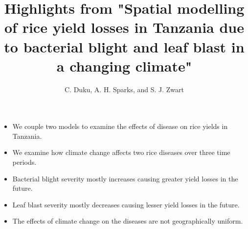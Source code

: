 \documentclass[12pt]{article}
\title{Highlights from "Spatial modelling of rice yield losses in Tanzania due to bacterial blight and leaf blast in a changing climate"}
\author{C. Duku, A. H. Sparks, and S. J. Zwart}
\date{}                                           %
\begin{document}
\maketitle


\begin{itemize}

\item We couple two models to examine the effects of disease on rice yields in Tanzania.
\item We examine how climate change affects two rice diseases over three time periods.
\item Bacterial blight severity mostly increases causing greater yield losses in the future.
\item Leaf blast severity mostly decreases causing lesser yield losses in the future.
\item The effects of climate change on the diseases are not geographically uniform.

\end{itemize}
\end{document}
